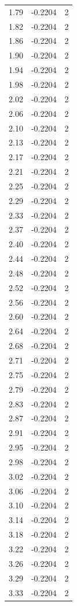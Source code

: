 \begin{longtable}{lrr}
  1.79 & -0.2204 & 2 \\
  1.82 & -0.2204 & 2 \\
  1.86 & -0.2204 & 2 \\
  1.90 & -0.2204 & 2 \\
  1.94 & -0.2204 & 2 \\
  1.98 & -0.2204 & 2 \\
  2.02 & -0.2204 & 2 \\
  2.06 & -0.2204 & 2 \\
  2.10 & -0.2204 & 2 \\
  2.13 & -0.2204 & 2 \\
  2.17 & -0.2204 & 2 \\
  2.21 & -0.2204 & 2 \\
  2.25 & -0.2204 & 2 \\
  2.29 & -0.2204 & 2 \\
  2.33 & -0.2204 & 2 \\
  2.37 & -0.2204 & 2 \\
  2.40 & -0.2204 & 2 \\
  2.44 & -0.2204 & 2 \\
  2.48 & -0.2204 & 2 \\
  2.52 & -0.2204 & 2 \\
  2.56 & -0.2204 & 2 \\
  2.60 & -0.2204 & 2 \\
  2.64 & -0.2204 & 2 \\
  2.68 & -0.2204 & 2 \\
  2.71 & -0.2204 & 2 \\
  2.75 & -0.2204 & 2 \\
  2.79 & -0.2204 & 2 \\
  2.83 & -0.2204 & 2 \\
  2.87 & -0.2204 & 2 \\
  2.91 & -0.2204 & 2 \\
  2.95 & -0.2204 & 2 \\
  2.98 & -0.2204 & 2 \\
  3.02 & -0.2204 & 2 \\
  3.06 & -0.2204 & 2 \\
  3.10 & -0.2204 & 2 \\
  3.14 & -0.2204 & 2 \\
  3.18 & -0.2204 & 2 \\
  3.22 & -0.2204 & 2 \\
  3.26 & -0.2204 & 2 \\
  3.29 & -0.2204 & 2 \\
  3.33 & -0.2204 & 2 \\

\end{longtable}
